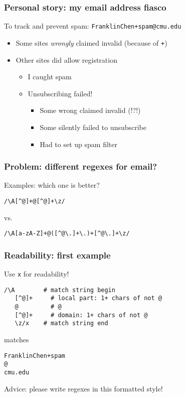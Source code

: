 \begin{frame}
  \frametitle{Personal story: my email address fiasco}

  To track and prevent spam: \texttt{FranklinChen+spam@cmu.edu}

  \begin{itemize}
    \item Some sites \emph{wrongly} claimed invalid (because of \texttt{+})
    \item Other sites did allow registration
      \begin{itemize}
        \item I caught spam
        \item Unsubscribing failed!
          \begin{itemize}
            \item Some wrong claimed invalid (!?!)
            \item Some silently failed to unsubscribe
            \item Had to set up spam filter
          \end{itemize}
      \end{itemize}
  \end{itemize}
\end{frame}

\begin{frame}[fragile]
  \frametitle{Problem: different regexes for email?}

  Examples: which one is better?

  \begin{verbatim}
/\A[^@]+@[^@]+\z/
  \end{verbatim}

  vs.
  
  \begin{verbatim}
/\A[a-zA-Z]+@([^@\.]+\.)+[^@\.]+\z/
  \end{verbatim}
\end{frame}

\begin{frame}[fragile]
  \frametitle{Readability: first example}

  Use \texttt{x} for readability!

  \begin{verbatim}
/\A        # match string begin
   [^@]+     # local part: 1+ chars of not @
   @         # @
   [^@]+     # domain: 1+ chars of not @
   \z/x    # match string end
  \end{verbatim}

  matches

  \begin{verbatim}
FranklinChen+spam
@
cmu.edu
  \end{verbatim}

  Advice: please write regexes in this formatted style!
\end{frame}

